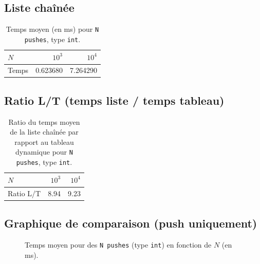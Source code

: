 \documentclass[12pt]{article}
\begin{document}
\subsection{Liste chaînée}
\begin{table}[ht]
\centering
\caption{Temps moyen (en ms) pour \texttt{N pushes}, type \texttt{int}.}
\begin{tabular}{lrr}
\toprule
\(N\) & \(10^3\) & \(10^4\) \\
\midrule
Temps & 0.623680 & 7.264290 \\
\bottomrule
\end{tabular}
\label{tab:liste-int-push}
\end{table}

\subsection{Ratio L/T (temps liste / temps tableau)}
\begin{table}[ht]
\centering
\caption{Ratio du temps moyen de la liste chaînée par rapport au tableau dynamique pour \texttt{N pushes}, type \texttt{int}.}
\begin{tabular}{lrr}
\toprule
\(N\) & \(10^3\) & \(10^4\) \\
\midrule
Ratio L/T & 8.94 & 9.23 \\
\bottomrule
\end{tabular}
\label{tab:ratio-lt}
\end{table}

\subsection{Graphique de comparaison (push uniquement)}
\begin{figure}[ht]
\centering
{}
\caption{Temps moyen pour des \texttt{N pushes} (type \texttt{int}) en fonction de $N$ (en ms).}
\label{fig:push-int}
\end{figure}
\end{document}
